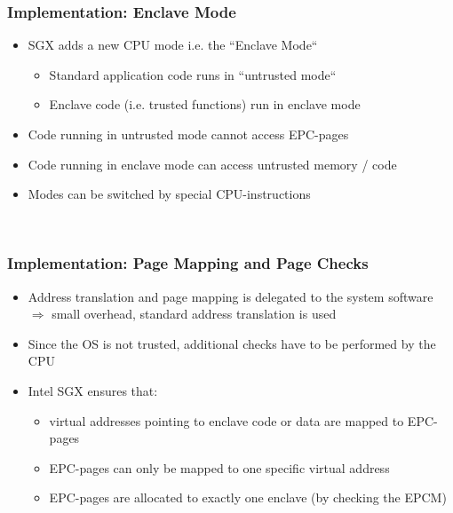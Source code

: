 \begin{frame}
    \frametitle{Implementation: Enclave Mode}
    \begin{itemize}[<+->]
        \item SGX adds a new CPU mode i.e. the ``Enclave Mode``
        \begin{itemize}
            \item Standard application code runs in ``untrusted mode``
            \item Enclave code (i.e. trusted functions) run in enclave mode
        \end{itemize}
        \item Code running in untrusted mode cannot access EPC-pages
        \item Code running in enclave mode can access untrusted memory / code
        \item Modes can be switched by special CPU-instructions
    \end{itemize}
    $ $ \newline
    \centering
\end{frame}

\begin{frame}
    \frametitle{Implementation: Page Mapping and Page Checks}
    \begin{itemize}[<+->]
        \item Address translation and page mapping is delegated to the system software \newline
              $\Rightarrow$ small overhead, standard address translation is used
        \item Since the OS is not trusted, additional checks have to be performed by the CPU
        \item Intel SGX ensures that: 
            \begin{itemize}
                \item virtual addresses pointing to enclave code or data are mapped to EPC-pages
                \item EPC-pages can only be mapped to one specific virtual address
                \item EPC-pages are allocated to exactly one enclave (by checking the EPCM)
            \end{itemize}
    \end{itemize}
\end{frame}

